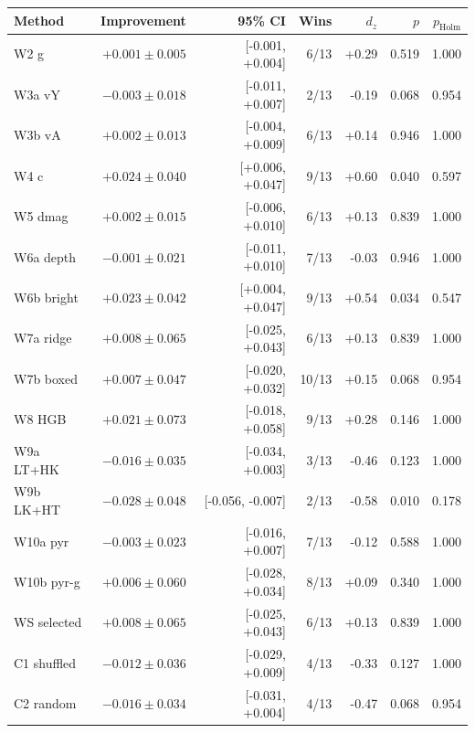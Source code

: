 \begin{tabular}{lrrrrrr}
\toprule
Method & Improvement & 95\% CI & Wins & $d_z$ & $p$ & $p_{\mathrm{Holm}}$ \\
\midrule
W2 g & $+0.001 \pm 0.005$ & [-0.001, +0.004] & 6/13 & +0.29 & 0.519 & 1.000 \\
W3a vY & $-0.003 \pm 0.018$ & [-0.011, +0.007] & 2/13 & -0.19 & 0.068 & 0.954 \\
W3b vA & $+0.002 \pm 0.013$ & [-0.004, +0.009] & 6/13 & +0.14 & 0.946 & 1.000 \\
W4 c & $+0.024 \pm 0.040$ & [+0.006, +0.047] & 9/13 & +0.60 & 0.040 & 0.597 \\
W5 dmag & $+0.002 \pm 0.015$ & [-0.006, +0.010] & 6/13 & +0.13 & 0.839 & 1.000 \\
W6a depth & $-0.001 \pm 0.021$ & [-0.011, +0.010] & 7/13 & -0.03 & 0.946 & 1.000 \\
W6b bright & $+0.023 \pm 0.042$ & [+0.004, +0.047] & 9/13 & +0.54 & 0.034 & 0.547 \\
W7a ridge & $+0.008 \pm 0.065$ & [-0.025, +0.043] & 6/13 & +0.13 & 0.839 & 1.000 \\
W7b boxed & $+0.007 \pm 0.047$ & [-0.020, +0.032] & 10/13 & +0.15 & 0.068 & 0.954 \\
W8 HGB & $+0.021 \pm 0.073$ & [-0.018, +0.058] & 9/13 & +0.28 & 0.146 & 1.000 \\
W9a LT+HK & $-0.016 \pm 0.035$ & [-0.034, +0.003] & 3/13 & -0.46 & 0.123 & 1.000 \\
W9b LK+HT & $-0.028 \pm 0.048$ & [-0.056, -0.007] & 2/13 & -0.58 & 0.010 & 0.178 \\
W10a pyr & $-0.003 \pm 0.023$ & [-0.016, +0.007] & 7/13 & -0.12 & 0.588 & 1.000 \\
W10b pyr-g & $+0.006 \pm 0.060$ & [-0.028, +0.034] & 8/13 & +0.09 & 0.340 & 1.000 \\
WS selected & $+0.008 \pm 0.065$ & [-0.025, +0.043] & 6/13 & +0.13 & 0.839 & 1.000 \\
C1 shuffled & $-0.012 \pm 0.036$ & [-0.029, +0.009] & 4/13 & -0.33 & 0.127 & 1.000 \\
C2 random & $-0.016 \pm 0.034$ & [-0.031, +0.004] & 4/13 & -0.47 & 0.068 & 0.954 \\
\bottomrule
\end{tabular}
